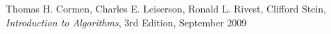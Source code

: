 \documentclass[12pt,a4paper,notitlepage]{article}
\begin{document}
\begin{center}
\end{center}

\begin{thebibliography}{9}
				Thomas H. Cormen,
				Charles E. Leiserson,
				Ronald L. Rivest,
				Clifford Stein,
				\emph{Introduction to Algorithms},
				3rd Edition,
				September 2009
\end{thebibliography}
\end{document}
